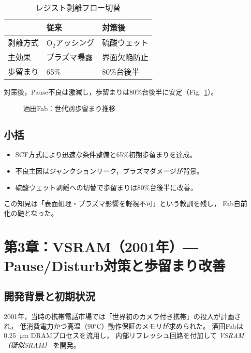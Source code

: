 \documentclass[conference]{IEEEtran}
\let\meter\metre
\begin{document}
\begin{table}[h]
  \centering
  \caption{レジスト剥離フロー切替}
  \label{tab:resist}
  \begin{tabular}{lll}
    \toprule
    & 従来 & 対策後 \\
    \midrule
    剥離方式 & O$_2$アッシング & 硫酸ウェット \\
    主効果 & プラズマ曝露 & 界面欠陥防止 \\
    歩留まり & 65\% & 80\%台後半 \\
    \bottomrule
  \end{tabular}
\end{table}

対策後，Pause不良は激減し，歩留まりは80\%台後半に安定（Fig.~\ref{fig:yield25}）。

\begin{figure}[t]
\centering
{}
\caption{酒田Fab：世代別歩留まり推移}
\label{fig:yield25}
\end{figure}

\subsection{小括}
\begin{itemize}
  \item SCF方式により迅速な条件整備と65\%初期歩留まりを達成。
  \item 不良主因はジャンクションリーク，プラズマダメージが背景。
  \item 硫酸ウェット剥離への切替で歩留まりは80\%台後半に改善。
\end{itemize}
この知見は「表面処理・プラズマ影響を軽視不可」という教訓を残し，
Fab自前化の礎となった。

\section{第3章：VSRAM（2001年）— Pause/Disturb対策と歩留まり改善}

\subsection{開発背景と初期状況}
2001年，当時の携帯電話市場では「世界初のカメラ付き携帯」の投入が計画され，
低消費電力かつ高温（90$^\circ$C）動作保証のメモリが求められた。
酒田Fabは \SI{0.25}{\micro\meter} DRAMプロセスを流用し，
内部リフレッシュ回路を付加して \emph{VSRAM（疑似SRAM）} を開発。
\end{document}

